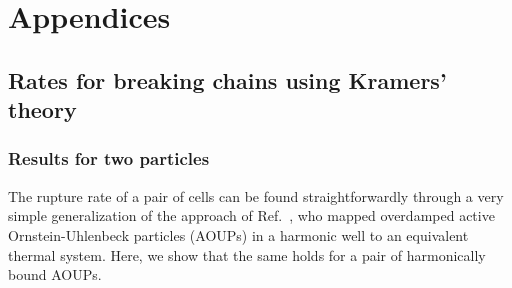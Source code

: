 
\section{Appendices}
\label{sec:ch3:appendices}

\subsection{Rates for breaking chains using Kramers' theory}
\label{sec:ch3:kramers}

\subsubsection{Results for two particles}
\label{sec:ch3:two_particle}

The rupture rate of a pair of cells can be found straightforwardly through a very simple generalization of the approach of Ref.~\cite{woillez2020active}, who mapped overdamped active Ornstein-Uhlenbeck particles (AOUPs) in a harmonic well to an equivalent thermal system. Here, we show that the same holds for a pair of harmonically bound AOUPs.


